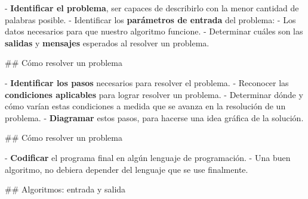 \vfill

- \textbf{Identificar el problema}, ser capaces de describirlo con la menor cantidad de palabras posible.
- Identificar los \textbf{parámetros de entrada} del problema:
    - Los datos necesarios para que nuestro algoritmo funcione.
- Determinar cuáles son las \textbf{salidas} y \textbf{mensajes} esperados al
resolver un problema.


## Cómo resolver un problema

\vspace{1em}
\begin{small}
\end{small}

\vfill

- \textbf{Identificar los pasos} necesarios para resolver el problema.
- Reconocer las \textbf{condiciones aplicables} para lograr
resolver un problema.
    - Determinar dónde y cómo varían estas condiciones a medida que se avanza en la resolución de un problema.
- \textbf{Diagramar} estos pasos, para hacerse una idea gráfica de la solución.

## Cómo resolver un problema

\vspace{1em}
\begin{small}
\end{small}

\vfill

- \textbf{Codificar} el programa final en algún lenguaje de programación.
- Una buen algoritmo, no debiera depender del lenguaje que se use finalmente.


## Algoritmos: entrada y salida


